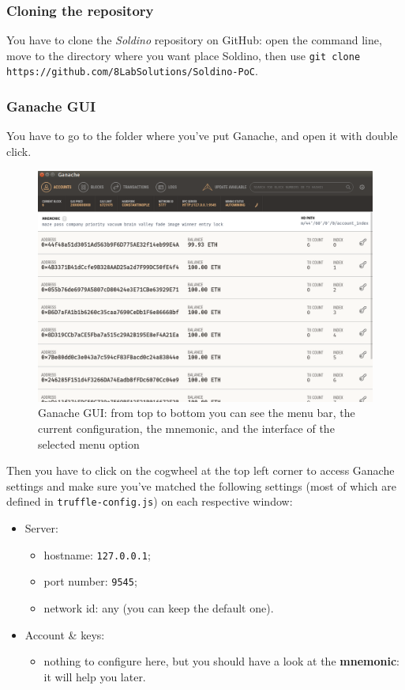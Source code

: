 \subsubsection{Cloning the repository}
You have to clone the \textit{Soldino} repository on GitHub: open the command line, move to the directory where you want place Soldino, then use \texttt{git clone https://github.com/8LabSolutions/Soldino-PoC}.

\subsubsection{Ganache GUI}
You have to go to the folder where you've put Ganache, and open it with double click.
\begin{figure}
	\centering
	\includegraphics[scale=0.25]{res/images/ganache-ui.png}
	\caption{Ganache GUI: from top to bottom you can see the menu bar, the current configuration, the mnemonic, and the interface of the selected menu option}
\end{figure}
Then you have to click on the cogwheel at the top left corner to access Ganache settings and make sure you've matched the following settings (most of which are defined in \texttt{truffle-config.js}) on each respective window:
\begin{itemize}
	\item Server:
	\begin{itemize}
		\item hostname: \texttt{127.0.0.1};
		\item port number: \texttt{9545};
		\item network id: any (you can keep the default one).
	\end{itemize}
	\item Account \& keys\glo:
	\begin{itemize}
		\item nothing to configure here, but you should have a look at the \textbf{mnemonic}: it will help you later.
	\end{itemize}
\end{itemize}

